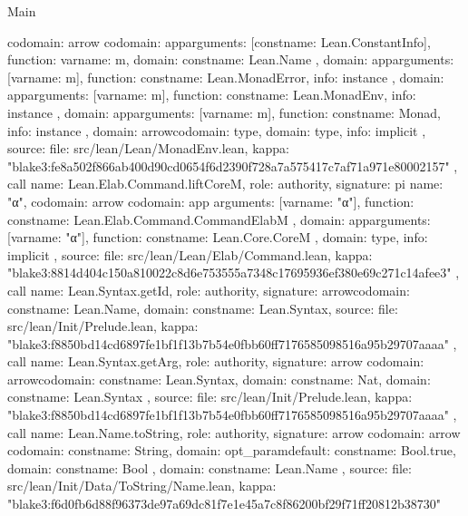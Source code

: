 \begin{lexlean}{Main}
\begin{toolingmodule}
{{{{{{              codomain: arrow{
                codomain: app{arguments: [const{name: Lean.ConstantInfo}], function: var{name: m}},
                domain: const{name: Lean.Name}
              },
              domain: app{arguments: [var{name: m}], function: const{name: Lean.MonadError}},
              info: instance
            },
            domain: app{arguments: [var{name: m}], function: const{name: Lean.MonadEnv}},
            info: instance
          },
          domain: app{arguments: [var{name: m}], function: const{name: Monad}},
          info: instance
        },
        domain: arrow{codomain: type{}, domain: type{}},
        info: implicit
      },
      source: {
        file: src/lean/Lean/MonadEnv.lean,
        kappa: "blake3:fe8a502f866ab400d90cd0654f6d2390f728a7a575417c7af71a971e80002157"
      }
    },
    call{
      name: Lean.Elab.Command.liftCoreM,
      role: authority,
      signature: pi{
        name: "α",
        codomain: arrow{
          codomain: app{
            arguments: [var{name: "α"}],
            function: const{name: Lean.Elab.Command.CommandElabM}
          },
          domain: app{arguments: [var{name: "α"}], function: const{name: Lean.Core.CoreM}}
        },
        domain: type{},
        info: implicit
      },
      source: {
        file: src/lean/Lean/Elab/Command.lean,
        kappa: "blake3:8814d404c150a810022c8d6e753555a7348c17695936ef380e69c271c14afee3"
      }
    },
    call{
      name: Lean.Syntax.getId,
      role: authority,
      signature: arrow{codomain: const{name: Lean.Name}, domain: const{name: Lean.Syntax}},
      source: {
        file: src/lean/Init/Prelude.lean,
        kappa: "blake3:f8850bd14cd6897fe1bf1f13b7b54e0fbb60ff7176585098516a95b29707aaaa"
      }
    },
    call{
      name: Lean.Syntax.getArg,
      role: authority,
      signature: arrow{
        codomain: arrow{codomain: const{name: Lean.Syntax}, domain: const{name: Nat}},
        domain: const{name: Lean.Syntax}
      },
      source: {
        file: src/lean/Init/Prelude.lean,
        kappa: "blake3:f8850bd14cd6897fe1bf1f13b7b54e0fbb60ff7176585098516a95b29707aaaa"
      }
    },
    call{
      name: Lean.Name.toString,
      role: authority,
      signature: arrow{
        codomain: arrow{
          codomain: const{name: String},
          domain: opt_param{default: const{name: Bool.true}, domain: const{name: Bool}}
        },
        domain: const{name: Lean.Name}
      },
      source: {
        file: src/lean/Init/Data/ToString/Name.lean,
        kappa: "blake3:f6d0fb6d88f96373de97a69dc81f7e1e45a7c8f86200bf29f71ff20812b38730"
}}}
\end{toolingmodule}
\end{lexlean}
